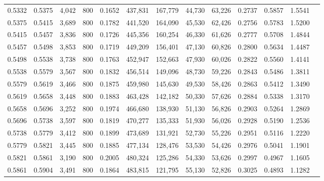 \begin{tabular}{rrrrrrrrrrrrr}
0.5332 & 0.5375 &  4,042 &   800 &                                     0.1652 & 437,831 & 167,779 &  44,730 &  63,226 & 0.2737 & 0.5857 & 1.5541 \\
0.5375 & 0.5415 &  3,689 &   800 &                                     0.1782 & 441,520 & 164,090 &  45,530 &  62,426 & 0.2756 & 0.5783 & 1.5200 \\
0.5415 & 0.5457 &  3,836 &   800 &                                     0.1726 & 445,356 & 160,254 &  46,330 &  61,626 & 0.2777 & 0.5708 & 1.4844 \\
0.5457 & 0.5498 &  3,853 &   800 &                                     0.1719 & 449,209 & 156,401 &  47,130 &  60,826 & 0.2800 & 0.5634 & 1.4487 \\
0.5498 & 0.5538 &  3,738 &   800 &                                     0.1763 & 452,947 & 152,663 &  47,930 &  60,026 & 0.2822 & 0.5560 & 1.4141 \\
0.5538 & 0.5579 &  3,567 &   800 &                                     0.1832 & 456,514 & 149,096 &  48,730 &  59,226 & 0.2843 & 0.5486 & 1.3811 \\
0.5579 & 0.5619 &  3,466 &   800 &                                     0.1875 & 459,980 & 145,630 &  49,530 &  58,426 & 0.2863 & 0.5412 & 1.3490 \\
0.5619 & 0.5658 &  3,448 &   800 &                                     0.1883 & 463,428 & 142,182 &  50,330 &  57,626 & 0.2884 & 0.5338 & 1.3170 \\
0.5658 & 0.5696 &  3,252 &   800 &                                     0.1974 & 466,680 & 138,930 &  51,130 &  56,826 & 0.2903 & 0.5264 & 1.2869 \\
0.5696 & 0.5738 &  3,597 &   800 &                                     0.1819 & 470,277 & 135,333 &  51,930 &  56,026 & 0.2928 & 0.5190 & 1.2536 \\
0.5738 & 0.5779 &  3,412 &   800 &                                     0.1899 & 473,689 & 131,921 &  52,730 &  55,226 & 0.2951 & 0.5116 & 1.2220 \\
0.5779 & 0.5821 &  3,445 &   800 &                                     0.1885 & 477,134 & 128,476 &  53,530 &  54,426 & 0.2976 & 0.5041 & 1.1901 \\
0.5821 & 0.5861 &  3,190 &   800 &                                     0.2005 & 480,324 & 125,286 &  54,330 &  53,626 & 0.2997 & 0.4967 & 1.1605 \\
0.5861 & 0.5904 &  3,491 &   800 &                                     0.1864 & 483,815 & 121,795 &  55,130 &  52,826 & 0.3025 & 0.4893 & 1.1282 \\

\end{tabular}
